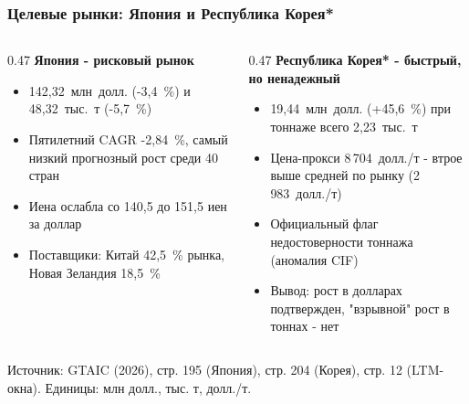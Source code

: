 \documentclass{beamer}
\begin{document}
\begin{frame}[t]
  \frametitle{Целевые рынки: Япония и Республика Корея*}
  {\footnotesize
  \begin{columns}[t]
    \begin{column}{0.47\textwidth}
      \textbf{Япония - рисковый рынок}
      \begin{itemize}
        \item 142,32~млн~долл. (-3,4~\%) и 48,32~тыс.~т (-5,7~\%)
        \item Пятилетний CAGR -2,84~\%, самый низкий прогнозный рост среди 40 стран
        \item Иена ослабла со 140,5 до 151,5 иен за доллар
        \item Поставщики: Китай 42,5~\% рынка, Новая Зеландия 18,5~\%
      \end{itemize}
    \end{column}
    \begin{column}{0.47\textwidth}
      \textbf{Республика Корея* - быстрый, но ненадежный}
      \begin{itemize}
        \item 19,44~млн~долл. (+45,6~\%) при тоннаже всего 2,23~тыс.~т
        \item Цена-прокси 8\,704~долл./т - втрое выше средней по рынку (2\,983~долл./т)
        \item Официальный флаг недостоверности тоннажа (аномалия CIF)
        \item Вывод: рост в долларах подтвержден, "взрывной" рост в тоннах - нет
      \end{itemize}
    \end{column}
  \end{columns}}
  \vfill
  {\scriptsize\color{srcgray} Источник: GTAIC (2026), стр. 195 (Япония), стр. 204 (Корея), стр. 12 (LTM-окна). Единицы: млн долл., тыс. т, долл./т.\par}
\end{frame}
\end{document}
